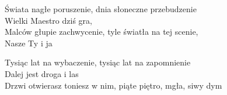 
\begin{text}
    Świata nagłe poruszenie, dnia słoneczne przebudzenie\\
    Wielki Maestro dziś gra,\\
    Malców głupie zachwycenie, tyle światła na tej scenie,\\
    Nasze Ty i ja

    Tysiąc lat na wybaczenie, tysiąc lat na zapomnienie\\
    Dalej jest droga i las\\
    Drzwi otwierasz toniesz w nim, piąte piętro, mgła, siwy dym
\end{text}
\begin{chord}

\end{chord}